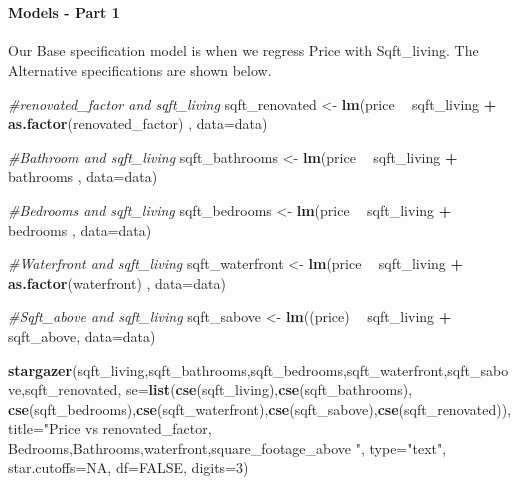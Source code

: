 \documentclass[
]{article}
\newenvironment{Shaded}{\begin{snugshade}}{\end{snugshade}}
\newcommand{\CommentTok}[1]{\textcolor[rgb]{0.56,0.35,0.01}{\textit{#1}}}
\newcommand{\DataTypeTok}[1]{\textcolor[rgb]{0.13,0.29,0.53}{#1}}
\newcommand{\DecValTok}[1]{\textcolor[rgb]{0.00,0.00,0.81}{#1}}
\newcommand{\KeywordTok}[1]{\textcolor[rgb]{0.13,0.29,0.53}{\textbf{#1}}}
\newcommand{\NormalTok}[1]{#1}
\newcommand{\OperatorTok}[1]{\textcolor[rgb]{0.81,0.36,0.00}{\textbf{#1}}}
\newcommand{\OtherTok}[1]{\textcolor[rgb]{0.56,0.35,0.01}{#1}}
\newcommand{\StringTok}[1]{\textcolor[rgb]{0.31,0.60,0.02}{#1}}
\begin{document}
~

\hypertarget{models---part-1}{%
\paragraph{Models - Part 1}\label{models---part-1}}

Our Base specification model is when we regress Price with Sqft\_living.
The Alternative specifications are shown below.

\begin{Shaded}
\begin{Highlighting}[]
\CommentTok{#renovated_factor and sqft_living}
\NormalTok{sqft_renovated <-}\StringTok{ }\KeywordTok{lm}\NormalTok{(price }\OperatorTok{~}\StringTok{ }\NormalTok{sqft_living }\OperatorTok{+}\StringTok{ }\KeywordTok{as.factor}\NormalTok{(renovated_factor) , }\DataTypeTok{data=}\NormalTok{data)}

\CommentTok{#Bathroom and sqft_living}
\NormalTok{sqft_bathrooms <-}\StringTok{  }\KeywordTok{lm}\NormalTok{(price }\OperatorTok{~}\StringTok{ }\NormalTok{sqft_living }\OperatorTok{+}\StringTok{ }\NormalTok{bathrooms , }\DataTypeTok{data=}\NormalTok{data)}

\CommentTok{#Bedrooms and sqft_living}
\NormalTok{sqft_bedrooms <-}\StringTok{  }\KeywordTok{lm}\NormalTok{(price }\OperatorTok{~}\StringTok{ }\NormalTok{sqft_living }\OperatorTok{+}\StringTok{ }\NormalTok{bedrooms , }\DataTypeTok{data=}\NormalTok{data)}

\CommentTok{#Waterfront and sqft_living}
\NormalTok{sqft_waterfront <-}\StringTok{  }\KeywordTok{lm}\NormalTok{(price }\OperatorTok{~}\StringTok{ }\NormalTok{sqft_living }\OperatorTok{+}\StringTok{ }\KeywordTok{as.factor}\NormalTok{(waterfront) , }\DataTypeTok{data=}\NormalTok{data)}

\CommentTok{#Sqft_above and sqft_living}
\NormalTok{sqft_sabove <-}\StringTok{ }\KeywordTok{lm}\NormalTok{((price) }\OperatorTok{~}\StringTok{ }\NormalTok{sqft_living }\OperatorTok{+}\StringTok{ }\NormalTok{sqft_above, }\DataTypeTok{data=}\NormalTok{data)}


\KeywordTok{stargazer}\NormalTok{(sqft_living,sqft_bathrooms,sqft_bedrooms,sqft_waterfront,sqft_sabove,sqft_renovated, }\DataTypeTok{se=}\KeywordTok{list}\NormalTok{(}\KeywordTok{cse}\NormalTok{(sqft_living),}\KeywordTok{cse}\NormalTok{(sqft_bathrooms), }\KeywordTok{cse}\NormalTok{(sqft_bedrooms),}\KeywordTok{cse}\NormalTok{(sqft_waterfront),}\KeywordTok{cse}\NormalTok{(sqft_sabove),}\KeywordTok{cse}\NormalTok{(sqft_renovated)),}\DataTypeTok{title=}\StringTok{"Price vs renovated_factor, Bedrooms,Bathrooms,waterfront,square_footage_above "}\NormalTok{, }\DataTypeTok{type=}\StringTok{"text"}\NormalTok{, }\DataTypeTok{star.cutoffs=}\OtherTok{NA}\NormalTok{, }\DataTypeTok{df=}\OtherTok{FALSE}\NormalTok{, }\DataTypeTok{digits=}\DecValTok{3}\NormalTok{)}
\end{Highlighting}
\end{Shaded}
\end{document}
